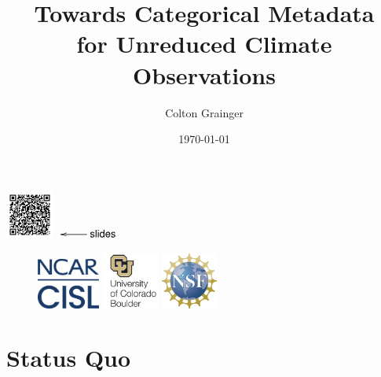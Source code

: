 \documentclass{beamer}
\title[Towards Categorical Metadata]{Towards Categorical Metadata\\ for Unreduced Climate Observations}
\author[C.~Grainger]{Colton Grainger}
\institute{University of Colorado Boulder}
\date{\today}
\begin{document}
\begin{frame}
    \hspace{-5.65em}\includegraphics[width=4.28em]{img/slides_qrcode.png}$\xymatrix{& \mathsf{slides} \ar[l]}$
\titlepage
\begin{figure}
    \includegraphics[height=4.5em]{img/CISL-contemp-logo-blue-square}\hspace{0.5em}
    \includegraphics[height=5em]{img/cu-logo}\hspace{0.5em}
    \includegraphics[height=5em]{img/nsf-logo}
\end{figure}
\end{frame}

\section{Status Quo}
\end{document}
